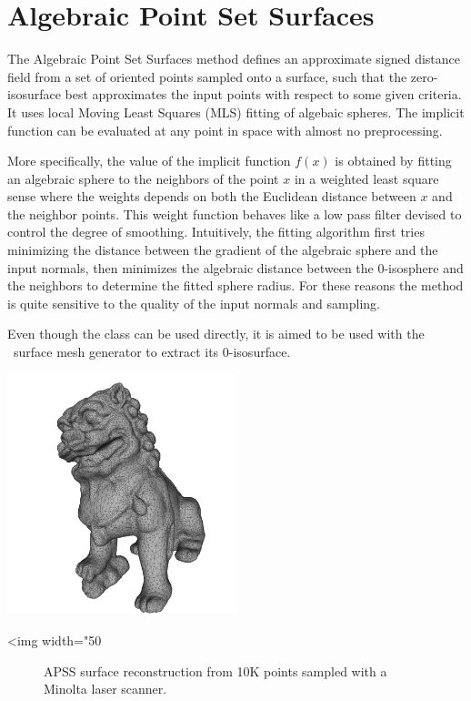 
\section{Algebraic Point Set Surfaces}

The Algebraic Point Set Surfaces \cite{Guennebaud07} method defines an approximate signed distance field from a set of oriented points sampled onto a surface, such that the zero-isosurface best approximates the input points with respect to some given criteria.  It uses local Moving Least Squares (MLS) fitting of algebaic spheres. The implicit function can be evaluated at any point in space with almost no preprocessing.

More specifically, the value of the implicit function $f(x)$ is obtained by fitting an algebraic sphere to the neighbors of the point $x$ in a weighted least square sense where the weights depends on both the Euclidean distance between $x$ and the neighbor points. This weight function behaves like a low pass filter devised to control the degree of smoothing. Intuitively, the fitting algorithm first tries minimizing the distance between the gradient of the algebraic sphere and the input normals, then minimizes the algebraic distance between the 0-isosphere and the neighbors to determine the fitted sphere radius. For these reasons the method is quite sensitive to the quality of the input normals and sampling.

Even though the  class can be used directly, it is aimed to be used with the \cgal\ surface mesh generator to extract its $0$-isosurface.


\begin{center}
    \begin{ccTexOnly}
        \includegraphics[width=0.5\textwidth]{Surface_reconstruction_points_3/APSS} %
    \end{ccTexOnly}
    \begin{ccHtmlOnly}
        <img width="50%
    \end{ccHtmlOnly}
    \begin{figure}[h]
        \caption{APSS surface reconstruction from 10K
                 points sampled with a Minolta laser scanner.}
        \label{Surface_reconstruction_points_3-fig-APSS}
    \end{figure}
\end{center}

